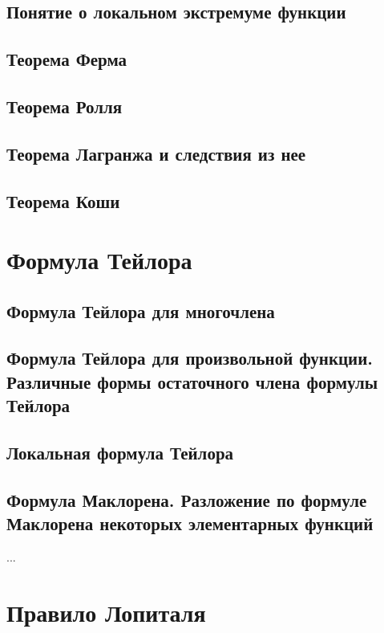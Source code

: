 \subsection{Понятие о локальном экстремуме функции}

\subsection{Теорема Ферма}

\subsection{Теорема Ролля}

\subsection{Теорема Лагранжа и следствия из нее}

\subsection{Теорема Коши}


\section{Формула Тейлора}
\subsection{Формула Тейлора для многочлена}
\subsection{Формула Тейлора для произвольной функции. Различные формы остаточного члена формулы Тейлора}
\subsection{Локальная формула Тейлора}
\subsection{Формула Маклорена. Разложение по формуле Маклорена некоторых элементарных функций}
...

\section{Правило Лопиталя}

